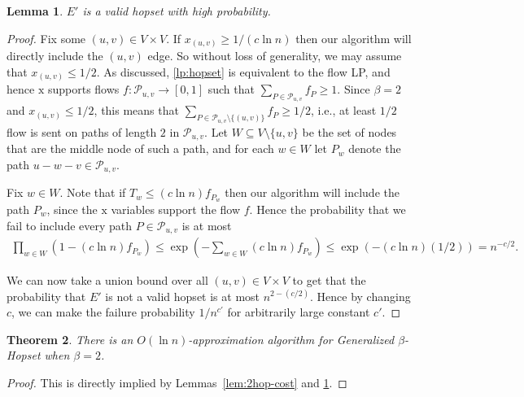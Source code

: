 \documentclass{article}
\newtheorem{theorem}{Theorem}[section]
\newtheorem{lemma}[theorem]{Lemma}
\theoremstyle{definition}
\theoremstyle{remark}
\def\be    {\beta}
\def\hopset {{\sc Generalized $\beta$-Hopset}}
\begin{document}
\begin{lemma} \label{lem:2hop-correct}
$E'$ is a valid hopset with high probability.
\end{lemma}
\begin{proof}
    Fix some $(u,v) \in V \times V$.  If $x_{(u,v)} \geq 1/(c \ln n)$ then our algorithm will directly include the $(u,v)$ edge.  So without loss of generality, we may assume that $x_{(u,v)} \leq 1/2$.  As discussed, \eqref{lp:hopset} is equivalent to the flow LP, and hence $\bm{\mathrm{x}}$ supports flows $f : \mathcal P_{u,v} \rightarrow [0,1]$ such that $\sum_{P \in \mathcal P_{u,v}} f_P \geq 1$.  Since $\beta = 2$ and $x_{(u,v)} \leq 1/2$, this means that $\sum_{P \in \mathcal P_{u,v} \setminus \{(u,v)\}} f_P \geq 1/2$, i.e., at least $1/2$ flow is sent on paths of length $2$ in $\mathcal P_{u,v}$.  Let $W \subseteq V \setminus \{u,v\}$ be the set of nodes that are the middle node of such a path, and for each $w \in W$ let $P_w$ denote the path $u-w-v \in \mathcal P_{u,v}$.

    Fix $w \in W$.  Note that if $T_w \leq (c \ln n) f_{P_w}$ then our algorithm will include the path $P_w$, since the $\bm{\mathrm{x}}$ variables support the flow $f$.  Hence the probability that we fail to include every path $P \in \mathcal P_{u,v}$ is at most
    \begin{align*}
        \prod_{w \in W} (1-(c\ln n) f_{P_w}) \leq \exp\left(-\sum_{w \in W} (c \ln n) f_{P_w}\right) \leq \exp(-(c \ln n) (1/2)) = n^{-c/2}.
    \end{align*}
    
    We can now take a union bound over all $(u,v) \in V \times V$ to get that the probability that $E'$ is not a valid hopset is at most $n^{2-(c/2)}$.  Hence by changing $c$, we can make the failure probability $1/n^{c'}$ for arbitrarily large constant $c'$.  
\end{proof}

\begin{theorem} \label{thm:2hop-main}
    There is an $O(\ln n)$-approximation algorithm for {\hopset} when $\be = 2$.
\end{theorem}
\begin{proof}
    This is directly implied by Lemmas~\ref{lem:2hop-cost} and \ref{lem:2hop-correct}.
\end{proof}
\else
\fi
\end{document}
